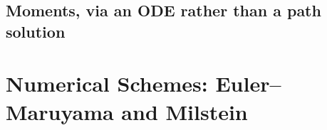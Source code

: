 \documentclass[11pt]{report}
\theoremstyle{plain}
\theoremstyle{definition}
\theoremstyle{remark}
\numberwithin{equation}{chapter}
\begin{document}
\section{Moments, via an ODE rather than a path solution}



\chapter{Numerical Schemes: Euler--Maruyama and Milstein}



\end{document}

